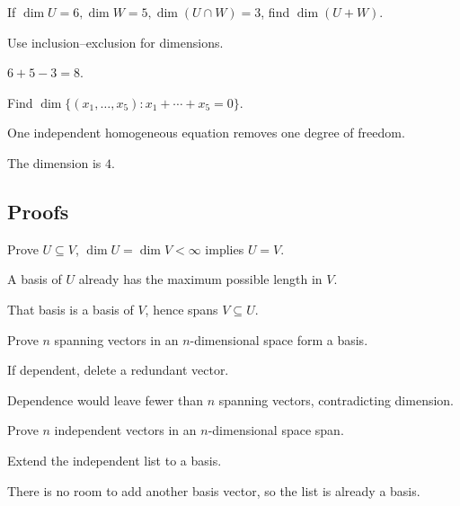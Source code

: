 \begin{exercise}\label{exr:i03-expand-04}
If \(\dim U=6,\dim W=5,\dim(U\cap W)=3\), find \(\dim(U+W)\).
\end{exercise}
\begin{hint}
Use inclusion--exclusion for dimensions.
\end{hint}
\begin{solution}
\(6+5-3=8\).
\end{solution}

\begin{exercise}\label{exr:i03-expand-05}
Find \(\dim\{(x_1,\ldots,x_5):x_1+\cdots+x_5=0\}\).
\end{exercise}
\begin{hint}
One independent homogeneous equation removes one degree of freedom.
\end{hint}
\begin{solution}
The dimension is \(4\).
\end{solution}

\subsection*{Proofs}

\begin{exercise}\label{exr:i03-expand-06}
Prove \(U\subseteq V\), \(\dim U=\dim V<\infty\) implies \(U=V\).
\end{exercise}
\begin{hint}
A basis of \(U\) already has the maximum possible length in \(V\).
\end{hint}
\begin{solution}
That basis is a basis of \(V\), hence spans \(V\subseteq U\).
\end{solution}

\begin{exercise}\label{exr:i03-expand-07}
Prove \(n\) spanning vectors in an \(n\)-dimensional space form a basis.
\end{exercise}
\begin{hint}
If dependent, delete a redundant vector.
\end{hint}
\begin{solution}
Dependence would leave fewer than \(n\) spanning vectors, contradicting dimension.
\end{solution}

\begin{exercise}\label{exr:i03-expand-08}
Prove \(n\) independent vectors in an \(n\)-dimensional space span.
\end{exercise}
\begin{hint}
Extend the independent list to a basis.
\end{hint}
\begin{solution}
There is no room to add another basis vector, so the list is already a basis.
\end{solution}

